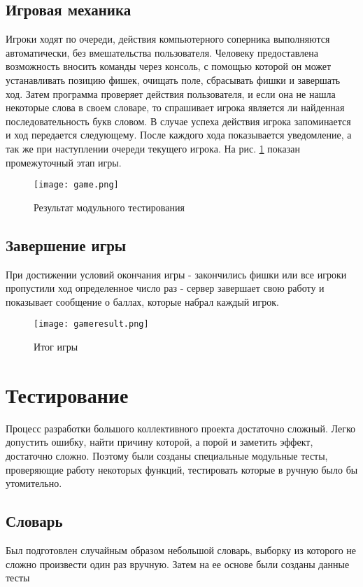 \documentclass[a4paper,14pt]{article}
\begin{document}
	\subsection{Игровая механика}
	Игроки ходят по очереди, действия компьютерного соперника выполняются автоматически, без вмешательства пользователя. Человеку предоставлена возможность вносить команды через консоль, с помощью которой он может устанавливать позицию фишек, очищать поле, сбрасывать фишки и завершать ход. Затем программа проверяет действия пользователя, и если она не нашла некоторые слова в своем словаре, то спрашивает игрока является ли найденная последовательность букв словом. В случае успеха действия игрока запоминается и ход передается следующему. После каждого хода показывается уведомление, а так же при наступлении очереди текущего игрока. На рис. \ref{img:game} показан промежуточный этап игры.
	
	\begin{figure}[bhtp]
		\centering
		\caption{Результат модульного тестирования}
		\texttt{[image: game.png]}\label{img:game}
	\end{figure}

	\subsection{Завершение игры}
	При достижении условий окончания игры - закончились фишки или все игроки пропустили ход определенное число раз - сервер завершает свою работу и показывает сообщение о баллах, которые набрал каждый игрок.
	
	\begin{figure}[bhtp]
		\centering
		\caption{Итог игры}
		\texttt{[image: gameresult.png]}\label{img:gameresult}
	\end{figure}
\section{Тестирование}
	Процесс разработки большого коллективного проекта достаточно сложный. Легко допустить ошибку, найти причину которой, а порой и заметить эффект, достаточно сложно. Поэтому были созданы специальные модульные тесты, проверяющие работу некоторых функций, тестировать которые в ручную было бы утомительно.
	
	\subsection{Словарь}
	Был подготовлен случайным образом небольшой словарь, выборку из которого не сложно произвести один раз вручную. Затем на ее основе были созданы данные тесты
	
\end{document}

